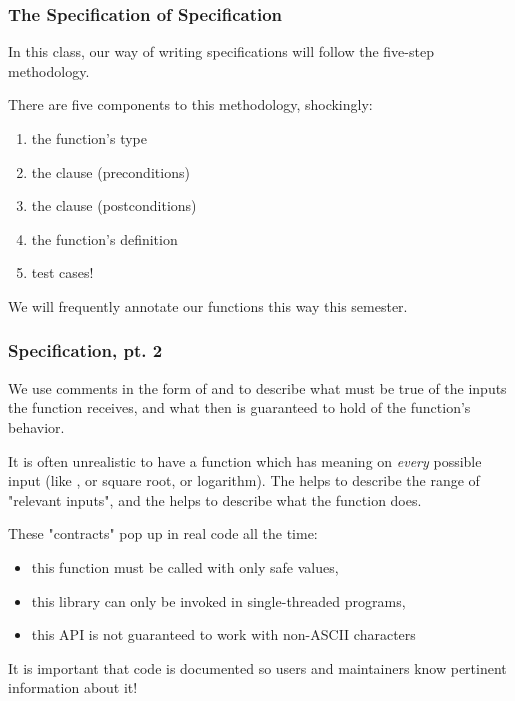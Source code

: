 \documentclass[aspectratio=169, handout]{beamer}
\begin{document}
\begin{frame}[fragile]
  \frametitle{The Specification of Specification}

  In this class, our way of writing specifications will follow the
  five-step methodology.

  \pause
  \vspace{\fill}

  There are five components to this methodology, shockingly:
  \pause
  \begin{enumerate}
    \item the function's type \pause
    \item the  clause (preconditions) \pause
    \item the  clause (postconditions) \pause
    \item the function's definition \pause
    \item test cases! \pause
  \end{enumerate}

  \vspace{\fill}

  We will frequently annotate our functions this way this semester.
\end{frame}

\begin{frame}[fragile]
  \frametitle{Specification, pt. 2}

  We use comments in the form of  and  to describe
  what must be true of the inputs the function receives, and what then is guaranteed
  to hold of the function's behavior.

  \pause
  \vspace{\fill}

  It is often unrealistic to have a function which has meaning on \textit{every} possible
  input (like , or square root, or logarithm). The  helps to
  describe the range of "relevant inputs", and the  helps to describe
  what the function does.

  \pause
  \vspace{\fill}

  These "contracts" pop up in real code all the time:
  \pause
  \begin{itemize}
    \item this function must be called with only safe values, \pause
    \item this library can only be invoked in single-threaded programs, \pause
    \item this API is not guaranteed to work with non-ASCII characters \pause
  \end{itemize}

  \vspace{\fill}

  It is important that code is documented so users and maintainers know pertinent
  information about it!
\end{frame}
\end{document}
